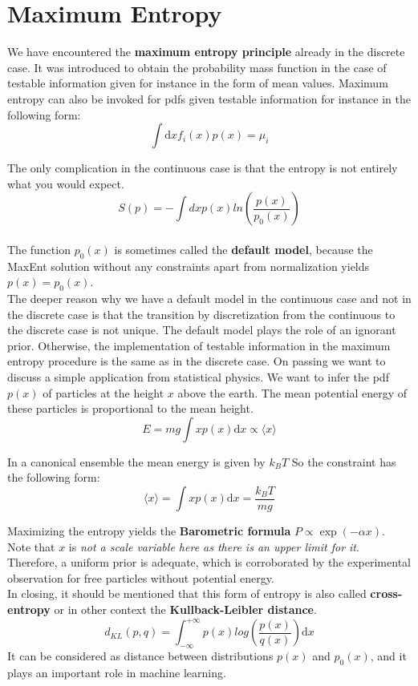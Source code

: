 \documentclass[12pt, a4paper]{scrartcl}
\begin{document}
\section*{Maximum Entropy}
We have encountered the \textbf{maximum entropy principle} already in the discrete case. It
was introduced to obtain the probability mass function in the case of testable
information given for instance in the form of mean values. Maximum entropy can also
be invoked for pdfs given testable information for instance in the following form:\[\int \text{d}x f_i(x)p(x)=\mu_i\]

The only complication in the continuous case is that the entropy is not entirely what you would expect.\\
\begin{equation*}\boxed{S(p)=-\int dx p(x)ln\left(\frac{p(x)}{p_0(x)}\right)
}\end{equation*}\\

The function $p_0(x)$ is sometimes called the \textbf{default model}, because the MaxEnt
solution without any constraints apart from normalization yields $p(x)=p_0(x)$.\\
The deeper reason why we have a default model in the continuous case and
not in the discrete case is that the transition by discretization from the
continuous to the discrete case is not unique.
The default model plays the role of an ignorant prior.
Otherwise, the implementation of testable information in the maximum entropy procedure is the same as in the discrete case.
On passing we want to discuss a simple application from statistical physics.
We want to infer the pdf $p(x)$ of particles at the height $x$ above the earth.
The mean potential energy of these particles is proportional to the mean
height.\[E=mg\int x p(x)\text{d}x \propto \langle x\rangle\]

In a canonical ensemble the mean energy is given by $k_BT$
So the constraint has the following form: \[ \langle x \rangle = \int xp(x)\text{d}x = \frac{k_BT}{mg}\]

Maximizing the entropy yields the \textbf{Barometric formula} $P\propto \exp(-\alpha x)$.
Note that $x$ is \textit{not
a scale variable here as there is an upper limit for it}. Therefore, a uniform prior
is adequate, which is corroborated by the experimental observation for free
particles without potential energy.\\

In closing, it should be mentioned that this form of entropy is also called
 \textbf{cross-entropy} or in other context the  \textbf{Kullback-Leibler distance}.
 \[d_{KL}(p,q)=\int_{-\infty}^{+\infty}p(x)log\left(\frac{p(x)}{q(x)}\right)\text{d}x\]
 It can be
considered as distance between distributions $p(x)$ and $p_0(x)$, and it plays
an important role in machine learning.\\
\end{document}
